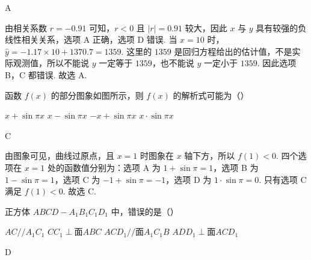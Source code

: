 \begin{answer}
A
\end{answer}

\begin{solution}
由相关系数 \(r=-0.91\) 可知，\(r<0\) 且 \(|r|=0.91\) 较大，因此 \(x\) 与 \(y\) 具有较强的负线性相关关系，选项 A 正确，选项 D 错误.
当 \(x=10\) 时，\(\hat y=-1.17\times 10+1370.7=1359\). 这里的 \(1359\) 是回归方程给出的估计值，不是实际观测值，所以不能说 \(y\) 一定等于 \(1359\)，也不能说 \(y\) 一定小于 \(1359\). 因此选项 B，C 都错误.
故选 A.
\end{solution}

\begin{problem}
函数 \(f(x)\) 的部分图象如图所示，则 \(f(x)\) 的解析式可能为（\quad）


\choices
    {\(x+\sin \pi x\)}
    {\(x-\sin \pi x\)}
    {\(-x+\sin \pi x\)}
    {\(x\cdot \sin \pi x\)}
\end{problem}

\begin{answer}
C
\end{answer}

\begin{solution}
由图象可见，曲线过原点，且 \(x=1\) 时图象在 \(x\) 轴下方，所以 \(f(1)<0\).
四个选项在 \(x=1\) 处的函数值分别为：选项 A 为 \(1+\sin \pi=1\)，选项 B 为 \(1-\sin \pi=1\)，选项 C 为 \(-1+\sin \pi=-1\)，选项 D 为 \(1\cdot \sin \pi=0\). 只有选项 C 满足 \(f(1)<0\).
故选 C.
\end{solution}

\begin{problem}
正方体 \(ABCD-A_1B_1C_1D_1\) 中，错误的是（\quad）

\choices
    {\(AC//A_1C_1\)}
    {\(CC_1\perp \text{面} ABC\)}
    {\(ACD_1//\text{面} A_1C_1B\)}
    {\(ADD_1\perp \text{面} ACD_1\)}
\end{problem}

\begin{answer}
D
\end{answer}

